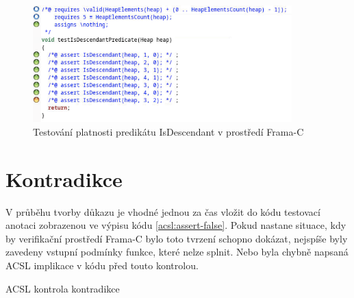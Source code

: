 \begin{figure}[H]
	\centering
	\includegraphics[width=10cm]{images/frama-c-test-IsDescendant}
	\caption{Testování platnosti predikátu IsDescendant v prostředí Frama-C}
	\label{img:F-C-test-IsDescendant}
\end{figure}


\section{Kontradikce}

V průběhu tvorby důkazu je vhodné jednou za čas vložit do kódu testovací anotaci zobrazenou ve výpisu kódu \ref{acsl:assert-false}. Pokud nastane situace, kdy by verifikační prostředí Frama-C bylo toto tvrzení schopno dokázat, nejspíše byly zavedeny vstupní podmínky funkce, které nelze splnit. Nebo byla chybně napsaná ACSL implikace v kódu před touto kontrolou.  

\begin{listing}[H]
	\caption{ACSL kontrola kontradikce}
	\label{acsl:assert-false}
	\inputminted{c}{code/assert-false.c}
\end{listing}




